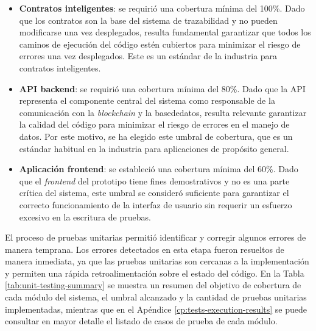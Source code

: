 \begin{itemize}
\item \textbf{Contratos inteligentes}: se requirió una cobertura mínima del 100\%. Dado que los contratos son la base del sistema de trazabilidad y no pueden modificarse una vez desplegados, resulta fundamental garantizar que todos los caminos de ejecución del código estén cubiertos para minimizar el riesgo de errores una vez desplegados. Este es un estándar de la industria para contratos inteligentes.
\item \textbf{API \gls{backend}}: se requirió una cobertura mínima del 80\%. Dado que la API representa el componente central del sistema como responsable de la comunicación con la \textit{\gls{blockchain}} y la \gls{basededatos}, resulta relevante garantizar la calidad del código para minimizar el riesgo de errores en el manejo de datos. Por este motivo, se ha elegido este umbral de cobertura, que es un estándar habitual en la industria para aplicaciones de propósito general.
\item \textbf{Aplicación \gls{frontend}}: se estableció una cobertura mínima del 60\%. Dado que el \textit{frontend} del prototipo tiene fines demostrativos y no es una parte crítica del sistema, este umbral se consideró suficiente para garantizar el correcto funcionamiento de la interfaz de usuario sin requerir un esfuerzo excesivo en la escritura de pruebas.
\end{itemize}

El proceso de pruebas unitarias permitió identificar y corregir algunos errores de manera temprana. Los errores detectados en esta etapa fueron resueltos de manera inmediata, ya que las pruebas unitarias son cercanas a la implementación y permiten una rápida retroalimentación sobre el estado del código. En la Tabla \ref{tab:unit-testing-summary} se muestra un resumen del objetivo de cobertura de cada módulo del sistema, el umbral alcanzado y la cantidad de pruebas unitarias implementadas, mientras que en el Apéndice \ref{cp:tests-execution-results} se puede consultar en mayor detalle el listado de casos de prueba de cada módulo.


